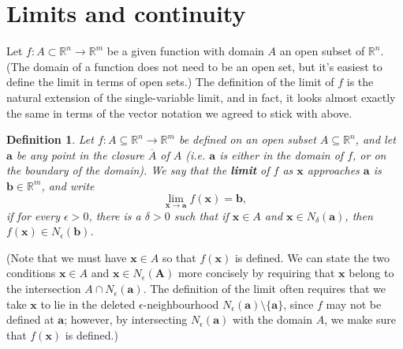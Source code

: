 \documentclass[12pt,letterpaper]{article}
\newtheorem{definition}[theorem]{Definition}
\newcommand{\R}{\mathbb{R}}
\newcommand{\x}{\mathbf{x}}
\begin{document}
\section{Limits and continuity}
Let $f:A\subset \R^n\to \R^m$ be a given function with domain $A$ an open subset of $\R^n$. (The domain of a function does not need to be an open set, but it's easiest to define the limit in terms of open sets.) The definition of the limit of $f$ is the natural extension of the single-variable limit, and in fact, it looks almost exactly the same in terms of the vector notation we agreed to stick with above.
\begin{definition}
Let $f:A\subseteq \R^n\to \R^m$ be defined on an open subset $A\subseteq\R^n$, and let $\mathbf{a}$ be any point in the closure $\overline{A}$ of $A$ (i.e. $\mathbf{a}$ is either in the domain of $f$, or on the boundary of the domain). We say that the {\bf limit} of $f$ as $\x$ approaches $\mathbf{a}$ is $\mathbf{b}\in\R^m$, and write
\[
\lim_{\x\to\mathbf{a}}f(\x) = \mathbf{b},
\]
if for every $\epsilon>0$, there is a $\delta>0$ such that if $\x\in A$ and $\x\in N_\delta(\mathbf{a})$, then $f(\x)\in N_\epsilon(\mathbf{b})$.
\end{definition}
(Note that we must have $\x\in A$ so that $f(\x)$ is defined. We can state the two conditions $\x\in A$ and $\x\in N_\epsilon(\mathbf{A})$ more concisely by requiring that $\x$ belong to the intersection $A\cap N_\epsilon(\mathbf{a})$. The definition of the limit often requires that we take $\x$ to lie in the deleted $\epsilon$-neighbourhood $N_\epsilon(\mathbf{a})\setminus\{\mathbf{a}\}$, since $f$ may not be defined at $\mathbf{a}$; however, by intersecting $N_\epsilon(\mathbf{a})$ with the domain $A$, we make sure that $f(\x)$ is defined.)
\end{document}
